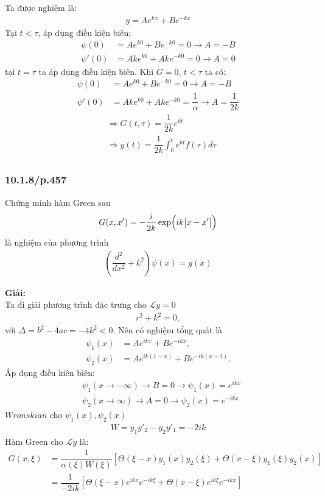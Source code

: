 \documentclass{report}
\newcommand{\f}[2]{\dfrac{#1}{#2}}
\begin{document}
\begin{enumerate}[label=(\alph*)]
	Ta được nghiệm là:  
	\begin{align*}
		y = A e^{kx} + B e^{-kx}
	\end{align*}
	Tại $t<\tau$,
	áp dụng điều kiện biên:
	\begin{align*}
		\psi(0) &= A e^{k0} + B e^{-k0} = 0  \rightarrow A = - B \\
		\psi'(0) &= Ak e^{k0} + Ak e^{-k0} = 0  \rightarrow A = 0
	\end{align*}
	tại $t = \tau$ ta áp dụng điều kiện biên. Khi $G =0$, $t<\tau$ ta có:
	\begin{align*}
		\psi(0) &= A e^{k0} + B e^{-k0} = 0  \rightarrow A = - B \\
		\psi'(0) &= Ak e^{k0} + Ak e^{-k0} = \f{1}{\alpha}  \rightarrow A = \f{1}{2k}
	\end{align*}
	\begin{align*}
		&\Rightarrow G(t,\tau) = \f{1}{2k} e^{kt} \\
		&\Rightarrow y(t) = \f{1}{2k} \int_{0}^{t} e^{kt} f(\tau) d\tau \\
	\end{align*}
\end{enumerate}
\subsubsection{10.1.8/p.457}
Chứng minh hàm Green sau 
\begin{align*}
	G(x,x') = -\f{i}{2k}\exp (ik \abs{x - x'})
\end{align*}
là nghiệm của phương trình 
\begin{align*}
	\left( \f{d^2}{dx^2} + k^2 \right) \psi(x) = g(x)
\end{align*}

\textbf{Giải:} \\
Ta đi giải phương trình đặc trưng cho $\mathcal{L} y = 0$
\begin{align*}
	r^2 + k^2 = 0,
\end{align*}
với $\Delta = b^2 - 4ac = -4k^2 < 0$. Nên có nghiệm tổng quát là
\begin{align*}
	\psi_1(x) &= Ae^{ikx} + Be^{-ikx}, \\
	\psi_2(x) &= Ae^{ik(1 - x)} + Be^{-ik(x-1)}.
\end{align*}
Áp dụng điều kiên biên:
\begin{align*}
	&\psi_1(x\rightarrow -\infty) \rightarrow B = 0 \rightarrow \psi_1(x) = e^{ikx} \\
	&\psi_2(x\rightarrow \infty) \rightarrow A = 0 \rightarrow \psi_2(x) = e^{-ikx}
\end{align*}
$Wronskian$ cho $\psi_1(x),\psi_2(x)$
\begin{align*}
	W = y_1 y'_2 - y_2 y'_1 = - 2ik
\end{align*}
Hàm Green cho $\mathcal{L} y$ là:
\begin{align*}
	G(x,\xi) 
	& = \f{1}{\alpha(\xi) W(\xi)} \left[ \Theta(\xi - x)y_{1}(x)y_{2}(\xi) + \Theta(x-\xi)y_{1}(\xi)y_{2}(x) \right] \\
	& = \f{1}{-2ik} \left[ \Theta(\xi - x) e^{ikx} e^{-ik\xi} + \Theta(x-\xi) e^{ik\xi} e^{-ikx}  \right]
\end{align*}
\end{document}
